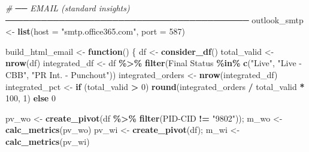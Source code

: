 \documentclass[
]{article}
\newenvironment{Shaded}{\begin{snugshade}}{\end{snugshade}}
\newcommand{\AttributeTok}[1]{\textcolor[rgb]{0.13,0.29,0.53}{#1}}
\newcommand{\CommentTok}[1]{\textcolor[rgb]{0.56,0.35,0.01}{\textit{#1}}}
\newcommand{\ControlFlowTok}[1]{\textcolor[rgb]{0.13,0.29,0.53}{\textbf{#1}}}
\newcommand{\DecValTok}[1]{\textcolor[rgb]{0.00,0.00,0.81}{#1}}
\newcommand{\FunctionTok}[1]{\textcolor[rgb]{0.13,0.29,0.53}{\textbf{#1}}}
\newcommand{\NormalTok}[1]{#1}
\newcommand{\OtherTok}[1]{\textcolor[rgb]{0.56,0.35,0.01}{#1}}
\newcommand{\SpecialCharTok}[1]{\textcolor[rgb]{0.81,0.36,0.00}{\textbf{#1}}}
\newcommand{\StringTok}[1]{\textcolor[rgb]{0.31,0.60,0.02}{#1}}
\begin{document}
\begin{Shaded}
\begin{Highlighting}[]
    \CommentTok{\# ── EMAIL (standard insights) ─────────────────────────────────────────}
\NormalTok{    outlook\_smtp }\OtherTok{\textless{}{-}} \FunctionTok{list}\NormalTok{(}\AttributeTok{host =} \StringTok{"smtp.office365.com"}\NormalTok{, }\AttributeTok{port =} \DecValTok{587}\NormalTok{)}
    
\NormalTok{    build\_html\_email }\OtherTok{\textless{}{-}} \ControlFlowTok{function}\NormalTok{() \{}
\NormalTok{      df          }\OtherTok{\textless{}{-}} \FunctionTok{consider\_df}\NormalTok{()}
\NormalTok{      total\_valid }\OtherTok{\textless{}{-}} \FunctionTok{nrow}\NormalTok{(df)}
\NormalTok{      integrated\_df }\OtherTok{\textless{}{-}}\NormalTok{ df }\SpecialCharTok{\%\textgreater{}\%} \FunctionTok{filter}\NormalTok{(}\StringTok{\textasciigrave{}}\AttributeTok{Final Status}\StringTok{\textasciigrave{}} \SpecialCharTok{\%in\%} \FunctionTok{c}\NormalTok{(}\StringTok{"Live"}\NormalTok{, }\StringTok{"Live {-} CBB"}\NormalTok{, }\StringTok{"PR Int. {-} Punchout"}\NormalTok{))}
\NormalTok{      integrated\_orders }\OtherTok{\textless{}{-}} \FunctionTok{nrow}\NormalTok{(integrated\_df)}
\NormalTok{      integrated\_pct    }\OtherTok{\textless{}{-}} \ControlFlowTok{if}\NormalTok{ (total\_valid }\SpecialCharTok{\textgreater{}} \DecValTok{0}\NormalTok{) }\FunctionTok{round}\NormalTok{(integrated\_orders }\SpecialCharTok{/}\NormalTok{ total\_valid }\SpecialCharTok{*} \DecValTok{100}\NormalTok{, }\DecValTok{1}\NormalTok{) }\ControlFlowTok{else} \DecValTok{0}
      
\NormalTok{      pv\_wo }\OtherTok{\textless{}{-}} \FunctionTok{create\_pivot}\NormalTok{(df }\SpecialCharTok{\%\textgreater{}\%} \FunctionTok{filter}\NormalTok{(}\StringTok{\textasciigrave{}}\AttributeTok{PID{-}CID}\StringTok{\textasciigrave{}} \SpecialCharTok{!=} \StringTok{"9802"}\NormalTok{)); m\_wo }\OtherTok{\textless{}{-}} \FunctionTok{calc\_metrics}\NormalTok{(pv\_wo)}
\NormalTok{      pv\_wi }\OtherTok{\textless{}{-}} \FunctionTok{create\_pivot}\NormalTok{(df);                                  m\_wi }\OtherTok{\textless{}{-}} \FunctionTok{calc\_metrics}\NormalTok{(pv\_wi)}
      

\end{Highlighting}
\end{Shaded}
\end{document}
